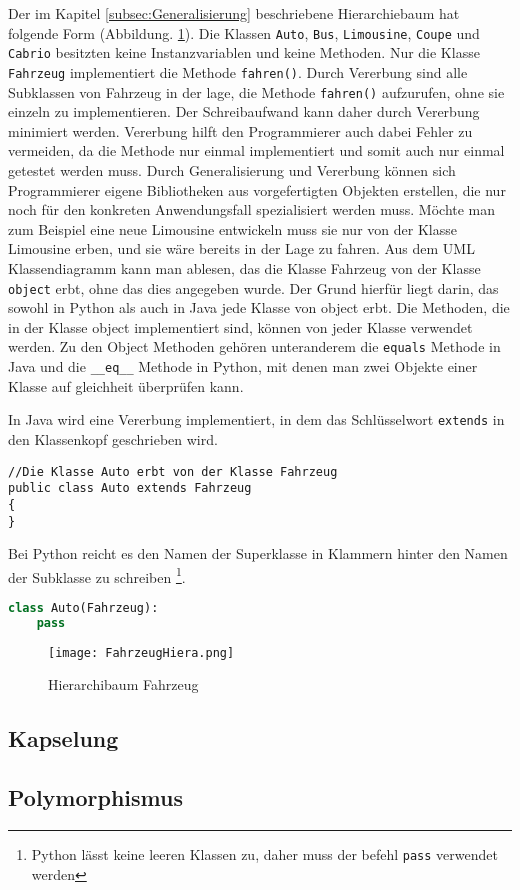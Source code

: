 Der im Kapitel \ref{subsec:Generalisierung} beschriebene Hierarchiebaum hat folgende Form (Abbildung. \ref{img:Hierarchiebaum}). Die Klassen \texttt{Auto}, \texttt{Bus}, \texttt{Limousine}, \texttt{Coupe} und \texttt{Cabrio} besitzten keine Instanzvariablen und keine Methoden. Nur die Klasse \texttt{Fahrzeug} implementiert die Methode \texttt{fahren()}.
Durch Vererbung sind alle Subklassen von Fahrzeug in der lage, die Methode \texttt{fahren()} aufzurufen, ohne sie einzeln zu implementieren. Der Schreibaufwand kann daher durch Vererbung minimiert werden. Vererbung hilft den Programmierer auch dabei Fehler zu vermeiden, da die Methode nur einmal implementiert und somit auch nur einmal getestet werden muss. Durch Generalisierung und Vererbung können sich Programmierer eigene Bibliotheken aus vorgefertigten Objekten  erstellen, die nur noch für den konkreten Anwendungsfall spezialisiert werden muss. Möchte man zum Beispiel eine neue Limousine entwickeln muss sie nur von der Klasse Limousine erben, und sie wäre bereits in der Lage zu fahren. Aus dem UML Klassendiagramm kann man ablesen, das die Klasse Fahrzeug von der Klasse \texttt{object} erbt, ohne das dies angegeben wurde. Der Grund hierfür liegt darin, das sowohl in Python als auch in Java jede Klasse von object erbt. Die Methoden, die in der Klasse object implementiert sind, können von jeder Klasse verwendet werden. Zu den Object Methoden gehören unteranderem die \texttt{equals} Methode in Java und die \texttt{\_\_eq\_\_} Methode in Python, mit denen man zwei Objekte einer Klasse auf gleichheit überprüfen kann. 

In Java wird eine Vererbung implementiert, in dem das Schlüsselwort \texttt{extends} in den Klassenkopf geschrieben wird.

\begin{lstlisting}[caption=Vererbung in Java, label=Vererbung Java]
//Die Klasse Auto erbt von der Klasse Fahrzeug
public class Auto extends Fahrzeug   
{ 
}
\end{lstlisting}

Bei Python reicht es den Namen der Superklasse in Klammern hinter den Namen der Subklasse zu schreiben \footnote{Python lässt keine leeren Klassen zu, daher muss der befehl \texttt{pass} verwendet werden}. 

\begin{lstlisting}[caption= Vererbung in Python, label=lst:Vererbungpython,language=Python]
class Auto(Fahrzeug):
    pass
\end{lstlisting}


\begin{figure}[!htb]
\centering
\texttt{[image: FahrzeugHiera.png]}%
\caption{Hierarchibaum Fahrzeug}
\label{img:Hierarchiebaum}
\end{figure}

\subsection{Kapselung} \label{subsec:Kapselung}


\subsection{Polymorphismus} \label{subsec:Polymorphismus}


